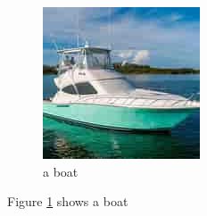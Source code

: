 \documentclass{article}
\begin{document}
	\begin{figure}
	\includegraphics[width=\linewidth]{boat.jpg}
		\caption{a boat}
		\label{fig:boat1}
	\end{figure}
    Figure \ref{fig:boat1} shows a boat
    
\end{document}
